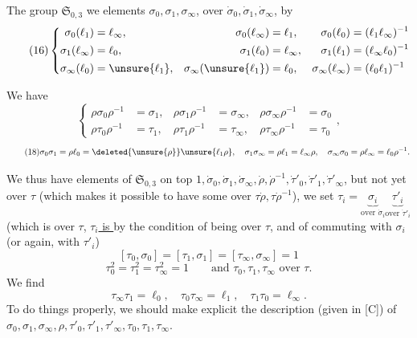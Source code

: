  The group $\mathfrak S_{0,3}$ we  elements
$\sigma_0,\sigma_1,\sigma_\infty$, over $\dot\sigma_0,\dot\sigma_1,\dot\sigma_\infty$, by
\[
\tag{16}
\left\{\begin{aligned}
\sigma_0(\ell_1)&=\ell_\infty,& \sigma_0(\ell_\infty)&=\ell_1,& \sigma_0(\ell_0)&=(\ell_1\ell_\infty)^{-1}\\
\sigma_1(\ell_\infty)&=\ell_0,& \sigma_1(\ell_0)&=\ell_\infty,& \sigma_1(\ell_1)&=(\ell_\infty\ell_0)^{-1}\\
\sigma_\infty(\ell_0)&=\unsure{\ell_1},& \sigma_\infty(\unsure{\ell_1})&=\ell_0,& \sigma_\infty(\ell_\infty)&=(\ell_0\ell_1)^{-1}
\end{aligned}\right.
\]

We have
\[
\tag{17}
\left\{\begin{aligned}
\rho\sigma_0\rho^{-1}&=\sigma_1,& \rho\sigma_1\rho^{-1}&=\sigma_\infty,& \rho\sigma_\infty\rho^{-1}&=\sigma_0\\
\rho\tau_0\rho^{-1}&=\tau_1,& \rho\tau_1\rho^{-1}&=\tau_\infty,& \rho\tau_\infty\rho^{-1}&=\tau_0
\end{aligned}\right.,
\]
\[
\tag{18}
\sigma_0\sigma_1=\rho\ell_0=\deleted{\unsure{\rho}}\unsure{\ell_1\rho},\quad
\sigma_1\sigma_\infty=\rho\ell_1=\ell_\infty\rho,\quad
\sigma_\infty\sigma_0=\rho\ell_\infty=\ell_0\rho^{-1}.
\]


We thus have elements of $\mathfrak S_{0,3}$ on top 
$1,\dot\sigma_0,\dot\sigma_1,\dot\sigma_\infty,\dot\rho,\dot\rho^{-1},\dot\tau'_0,\dot\tau'_1,\dot\tau'_\infty$,
but not yet over $\tau$ (which makes it possible to have some over $\tau\dot\rho,\tau\dot\rho^{-1}$),
we set
$\tau_i=\underbrace{\sigma_i}_{\text{over }\dot\sigma_i}\underbrace{\tau'_i}_{\text{over }\dot\tau'_i}$
(which is over $\tau$, 
\uline{$\tau_i$ is } 
by the condition of being over $\tau$,  and of commuting with $\sigma_i$ (or again, with $\tau'_i$)
\[
\tag{19}
[\tau_0,\sigma_0]=[\tau_1,\sigma_1]=[\tau_\infty,\sigma_\infty]=1
\]
\[
\tag{20}
\tau_0^2=\tau_1^2=\tau_\infty^2=1
\qquad\text{and }\tau_0,\tau_1,\tau_\infty\text{ over }\tau.
\]
We find
\[
\tag{21}
\tau_\infty\tau_1=\ell_0,\quad\tau_0\tau_\infty=\ell_1,\quad\tau_1\tau_0=\ell_\infty.
\]
To do things properly, we should make explicit the  description (given in [C]) of
$\sigma_0,\sigma_1,\sigma_\infty,\rho,\tau'_0,\tau'_1,\tau'_\infty,\tau_0,\tau_1,\tau_\infty$.

